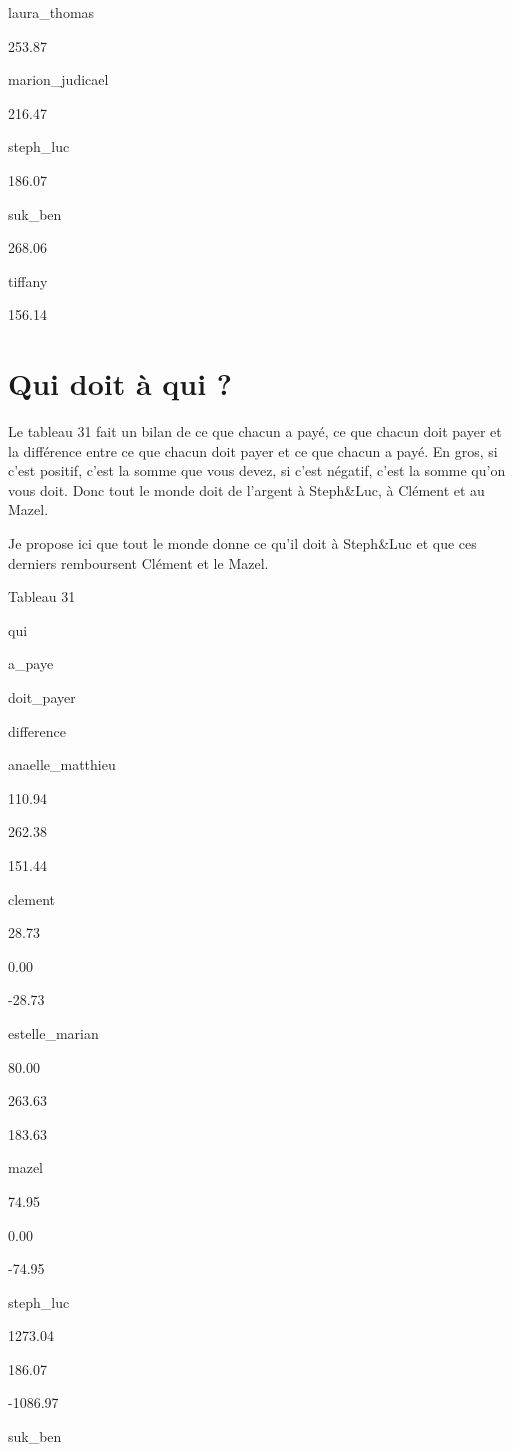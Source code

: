 \documentclass[]{article}
\begin{document}
laura\_thomas

253.87

marion\_judicael

216.47

steph\_luc

186.07

suk\_ben

268.06

tiffany

156.14

\hypertarget{qui-doit-a-qui}{%
\section{Qui doit à qui ?}\label{qui-doit-a-qui}}

Le tableau 31 fait un bilan de ce que chacun a payé, ce que chacun doit
payer et la différence entre ce que chacun doit payer et ce que chacun a
payé. En gros, si c'est positif, c'est la somme que vous devez, si c'est
négatif, c'est la somme qu'on vous doit. Donc tout le monde doit de
l'argent à Steph\&Luc, à Clément et au Mazel.

Je propose ici que tout le monde donne ce qu'il doit à Steph\&Luc et que
ces derniers remboursent Clément et le Mazel.

Tableau 31

qui

a\_paye

doit\_payer

difference

anaelle\_matthieu

110.94

262.38

151.44

clement

28.73

0.00

-28.73

estelle\_marian

80.00

263.63

183.63

mazel

74.95

0.00

-74.95

steph\_luc

1273.04

186.07

-1086.97

suk\_ben
\end{document}
